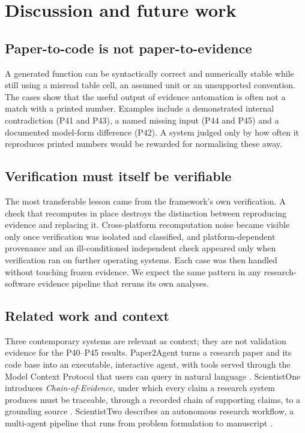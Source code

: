 \section{Discussion and future work}
\label{sec:discussion}

\subsection{Paper-to-code is not paper-to-evidence}
A generated function can be syntactically correct and numerically stable while still using a misread table cell, an assumed unit or an unsupported convention. The cases show that the useful output of evidence automation is often not a match with a printed number. Examples include a demonstrated internal contradiction (P41 and P43), a named missing input (P44 and P45) and a documented model-form difference (P42). A system judged only by how often it reproduces printed numbers would be rewarded for normalising these away.

\subsection{Verification must itself be verifiable}
The most transferable lesson came from the framework's own verification. A check that recomputes in place destroys the distinction between reproducing evidence and replacing it. Cross-platform recomputation noise became visible only once verification was isolated and classified, and platform-dependent provenance and an ill-conditioned independent check appeared only when verification ran on further operating systems. Each case was then handled without touching frozen evidence. We expect the same pattern in any research-software evidence pipeline that reruns its own analyses.

\subsection{Related work and context}
Three contemporary systems are relevant as context; they are not validation evidence for the P40--P45 results. Paper2Agent turns a research paper and its code base into an executable, interactive agent, with tools served through the Model Context Protocol that users can query in natural language \cite{Miao2026Paper2Agent}. ScientistOne introduces \emph{Chain-of-Evidence}, under which every claim a research system produces must be traceable, through a recorded chain of supporting claims, to a grounding source \cite{Meng2026ScientistOne}. ScientistTwo describes an autonomous research workflow, a multi-agent pipeline that runs from problem formulation to manuscript \cite{Nam2026ScientistTwo}.

